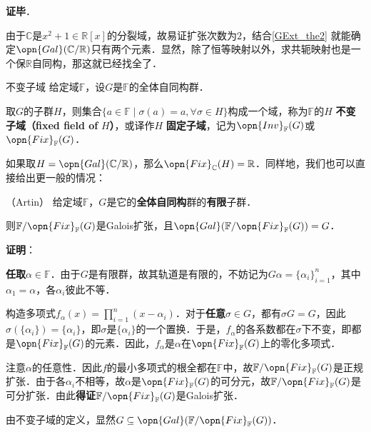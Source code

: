 \textbf{证毕}．



由于$\mathbb{C}$是$x^2+1\in\mathbb{R}[x]$的分裂域，故易证扩张次数为$2$，结合\autoref{GExt_the2} 就能确定$\opn{Gal}(\mathbb{C}/\mathbb{R})$只有两个元素．显然，除了恒等映射以外，求共轭映射也是一个保$\mathbb{R}$自同构，那这就已经找全了．




\begin{definition}{不变子域}
给定域$\mathbb{F}$，设$G$是$\mathbb{F}$的全体自同构群．

取$G$的子群$H$，则集合$\{a\in\mathbb{F}\mid \sigma(a)=a, \forall \sigma\in H\}$构成一个域，称为$\mathbb{F}$的$H$ \textbf{不变子域（fixed field of }$H$\textbf{）}，或译作$H$ \textbf{固定子域}，记为$\opn{Inv}_\mathbb{F}(G)$或$\opn{Fix}_\mathbb{F}(G)$．
\end{definition}

如果取$H=\opn{Gal}(\mathbb{C}/\mathbb{R})$，那么$\opn{Fix}_{\mathbb{C}}(H)=\mathbb{R}$．同样地，我们也可以直接给出更一般的情况：



\begin{theorem}{（Artin）}\label{GExt_the3}
给定域$\mathbb{F}$，$G$是它的\textbf{全体自同构}群的\textbf{有限}子群．

则$\mathbb{F}/\opn{Fix}_\mathbb{F}(G)$是Galois扩张，且$\opn{Gal}(\mathbb{F}/\opn{Fix}_\mathbb{F}(G))=G$．
\end{theorem}

\textbf{证明}：

\textbf{任取}$\alpha\in\mathbb{F}$．由于$G$是有限群，故其轨道是有限的，不妨记为$G\alpha=\{\alpha_i\}_{i=1}^n$，其中$\alpha_1=\alpha$，各$\alpha_i$彼此不等．

构造多项式$f_\alpha(x)=\prod_{i=1}^n(x-\alpha_i)$．对于\textbf{任意}$\sigma\in G$，都有$\sigma G=G$，因此$\sigma(\{\alpha_i\})=\{\alpha_i\}$，即$\sigma$是$\{\alpha_i\}$的一个置换．于是，$f_\alpha$的各系数都在$\sigma$下不变，即都是$\opn{Fix}_\mathbb{F}(G)$的元素．因此，$f_\alpha$是$\alpha$在$\opn{Fix}_\mathbb{F}(G)$上的零化多项式．

注意$\alpha$的任意性．因此$f$的最小多项式的根全都在$\mathbb{F}$中，故$\mathbb{F}/\opn{Fix}_\mathbb{F}(G)$是正规扩张．由于各$\alpha_i$不相等，故$\alpha$是$\opn{Fix}_\mathbb{F}(G)$的可分元，故$\mathbb{F}/\opn{Fix}_\mathbb{F}(G)$是可分扩张．由此\textbf{得证}$\mathbb{F}/\opn{Fix}_\mathbb{F}(G)$是Galois扩张．

由不变子域的定义，显然$G\subseteq\opn{Gal}(\mathbb{F}/\opn{Fix}_\mathbb{F}(G))$．

